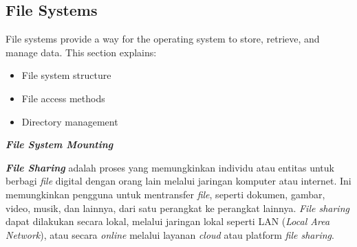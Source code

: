 \documentclass[12pt]{article}
\begin{document}
\subsection{File Systems}
File systems provide a way for the operating system to store, retrieve, and manage data. This section explains:
\begin{itemize}
    \item File system structure
    \item File access methods
    \item Directory management
\end{itemize}
\item \textbf{\textit{File System Mounting }}
\item \textbf{\textit{File Sharing}} adalah proses yang memungkinkan individu atau entitas untuk berbagi \textit{file} digital dengan orang lain melalui jaringan komputer atau internet. Ini memungkinkan pengguna untuk mentransfer \textit{file}, seperti dokumen, gambar, video, musik, dan lainnya, dari satu perangkat ke perangkat lainnya. \textit{File sharing} dapat dilakukan secara lokal, melalui jaringan lokal seperti LAN (\textit{Local Area Network}), atau secara \textit{online} melalui layanan\textit{ cloud} atau platform \textit{file sharing}.
\end{document}
